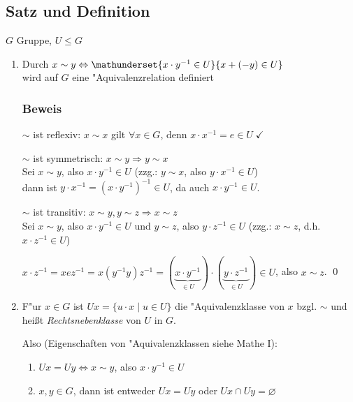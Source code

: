 	\subsection[Satz und Definition: Rechtsnebenklassen]{Satz und Definition}
	$G$ Gruppe, $U \leqslant G$
	{\renewcommand{\labelenumi}{(\roman{enumi})}
	\begin{enumerate}
		\item
		{Durch} $x \sim y \Leftrightarrow \mathunderset{x \cdot y^{-1} \in U}{x + (-y) \in U}$ \\
		wird auf $G$ eine "Aquivalenzrelation definiert
		
		\subsubsection*{Beweis}
		
		$\sim$ ist reflexiv: $x \sim x$ gilt $\forall x \in G$, denn $x \cdot x^{-1}= e \in U \; \checkmark$
		
		$\sim$ ist symmetrisch: $x \sim y \Rightarrow y \sim x$\\
		 Sei $x \sim y$, also $x \cdot y^{-1} \in U$ (zzg.: $y \sim x$, also $y \cdot x^{-1} \in U$) \\dann ist $y \cdot x^{-1} = (x \cdot y^{-1})^{-1} \in U$, da auch $ x \cdot y^{-1} \in U$.
		 
		$\sim$ ist transitiv: $x \sim y, y \sim z \Rightarrow x \sim z$\\
		Sei $x \sim y$, also $x \cdot y^{-1} \in U$ und $y \sim z$, also $y \cdot z^{-1} \in U$ (zzg.: $x \sim z$, d.h. $x\cdot z^{-1} \in U$)
		
		$x \cdot z^{-1} = xez^{-1} = x(y^{-1}y)z^{-1} = (\underbrace{x \cdot y^{-1}}_{\in U}) \cdot (\underbrace{y \cdot z^{-1}}_{\in U}) \in U$, also $x \sim z$.
		\qed
		
		
		\item
		F"ur $x \in G$ ist $Ux = \{u \cdot x \;|\; u \in U\}$ die "Aquivalenzklasse von $x$ bzgl. $\sim$ und heißt \emph{Rechtsnebenklasse} von $U$ in $G$.
		
		Also (Eigenschaften von "Aquivalenzklassen siehe Mathe I):
		\begin{enumerate}
			\item
			$Ux = Uy \Leftrightarrow x \sim y$, also $x \cdot y^{-1} \in U$
			\item
			$x,y \in G$, dann ist entweder $Ux = Uy$ oder $Ux \cap Uy = \varnothing $
		\end{enumerate}
		

\end{enumerate}}
